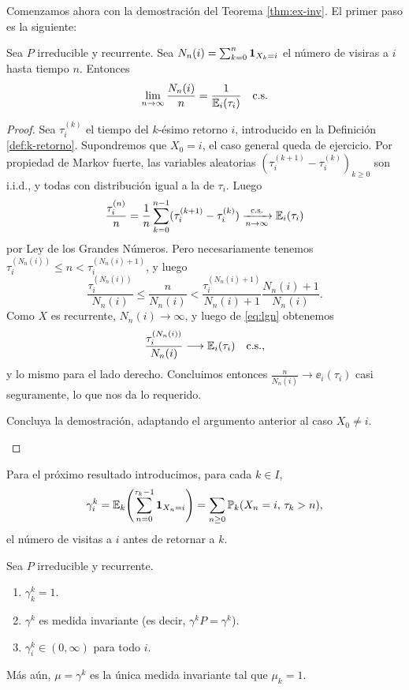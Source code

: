 Comenzamos ahora con la demostración del Teorema \ref{thm:ex-inv}.
El primer paso es  la siguiente:

\begin{prop}\label{prop:timeconv}
Sea $P$ irreducible y recurrente.
Sea $N_n(i)=\sum_{k=0}^n\mathbf{1}_{X_k=i}$ el número de visiras a $i$ hasta tiempo $n$.
Entonces
\[\lim_{n\to\infty}\frac{N_n(i)}{n}=\frac1{\mathbb{E}_i(\tau_i)}\quad\text{\upshape{c.s.}}\]
\end{prop}

\begin{proof}
Sea $\tau^{(k)}_i$ el tiempo del $k$-ésimo retorno $i$, introducido en la Definición \ref{def:k-retorno}.
Supondremos que $X_0=i$, el caso general queda de ejercicio.
Por propiedad de Markov fuerte, las variables aleatorias $(\tau^{(k+1)}_i-\tau^{(k)}_i)_{k\geq0}$ son i.i.d., y todas con distribución igual a la de $\tau_i$.
Luego
\begin{equation}
\frac{\tau^{(n)}_i}{n}=\frac1{n}\sum_{k=0}^{n-1}(\tau^{(k+1)}_i-\tau^{(k)}_i)
\xrightarrow[n\to\infty]{\text{\upshape{c.s.}}}\mathbb{E}_i(\tau_i)\label{eq:lgn}
\end{equation}
por Ley de los Grandes Números.
Pero necesariamente tenemos $\tau^{(N_n(i))}_i\leq n<\tau^{(N_n(i)+1)}_i$, y luego
\[\frac{\tau^{(N_n(i))}_i}{N_n(i)}\leq\frac{n}{N_n(i)}<\frac{\tau^{(N_n(i)+1)}_i}{N_n(i)+1}\frac{N_n(i)+1}{N_n(i)}.\]
Como $X$ es recurrente, $N_n(i)\to\infty$, y luego de \eqref{eq:lgn} obtenemos 
\[\frac{\tau_i^{(N_n(i))}}{N_n(i)}\longrightarrow\mathbb{E}_i(\tau_i)\quad\text{\upshape{c.s.}},\]
y lo mismo para el lado derecho.
Concluimos entonces $\frac{n}{N_n(i)}\longrightarrow\ee_i(\tau_i)$ casi seguramente, lo que nos da lo requerido.

\begin{exer}
Concluya la demostración, adaptando el argumento anterior al caso $X_0\neq i$.\qedhere
\end{exer}
\end{proof}

Para el próximo resultado introducimos, para cada $k\in I$,
\[\gamma_i^k=\mathbb{E}_k\!\left(\sum_{n=0}^{\tau_k-1}\mathbf{1}_{X_n=i}\right)=\sum_{n\geq0}\mathbb{P}_k(X_n=i,\,\tau_k>n),\]
el número de visitas a $i$ antes de retornar a $k$.

\begin{prop}\label{prop:gammaik}
Sea $P$ irreducible y recurrente.
\begin{enumerate}[label=\uptext{(\alph*)}]
\item $\gamma^k_k=1$.
\item $\gamma^k$ es medida invariante (es decir, $\gamma^kP=\gamma^k$).
\item $\gamma^k_i\in(0,\infty)$ para todo $i$.
\end{enumerate}
Más aún, $\mu=\gamma^k$ es la única medida invariante tal que $\mu_k=1$.
\end{prop}

